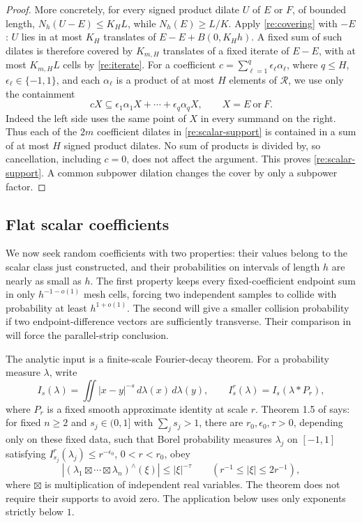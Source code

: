\begin{proof}
More concretely, for every signed product dilate \(U\) of \(E\) or
\(F\), of bounded length, \(N_h(U-E)\le K_HL\), while
\(N_h(E)\ge L/K\).  Apply \eqref{re:covering} with \(-E\): \(U\)
lies in at most \(K_H\) translates of \(E-E+B(0,K_Hh)\).
A fixed sum of such dilates is therefore covered by \(K_{m,H}\)
translates of a fixed iterate of \(E-E\), with at most
\(K_{m,H}L\) cells by \eqref{re:iterate}.  For a coefficient
\(c=\sum_{\ell=1}^q\epsilon_\ell\alpha_\ell\), where
\(q\le H\), \(\epsilon_\ell\in\{-1,1\}\), and each
\(\alpha_\ell\) is a product of at most \(H\) elements of
\(\mathcal R\), we use only the containment
\[
 cX\subseteq \epsilon_1\alpha_1X+\cdots+\epsilon_q\alpha_qX,
 \qquad X=E\ \text{or}\ F.
\]
Indeed the left side uses the same point of \(X\) in every summand
on the right.  Thus each of the \(2m\) coefficient dilates in
\eqref{re:scalar-support} is contained in a sum of at most \(H\)
signed product dilates.  No sum of products is divided by, so
cancellation, including \(c=0\), does not affect the argument.
This proves \eqref{re:scalar-support}.
A common subpower dilation changes the cover by only a subpower
factor.
\end{proof}

\subsection{Flat scalar coefficients}

We now seek random coefficients with two properties: their values
belong to the scalar class just constructed, and their probabilities
on intervals of length \(h\) are nearly as small as \(h\).  The
first property keeps every fixed-coefficient endpoint sum in only
\(h^{-1-o(1)}\) mesh cells, forcing two independent samples to
collide with probability at least \(h^{1+o(1)}\).  The second will
give a smaller collision probability if two endpoint-difference
vectors are sufficiently transverse.  Their comparison in
 will force the parallel-strip conclusion.

The analytic input is a finite-scale Fourier-decay theorem.  For a
probability measure \(\lambda\), write
\[
 I_s(\lambda)=\iint |x-y|^{-s}\,d\lambda(x)\,d\lambda(y),
 \qquad I_s^r(\lambda)=I_s(\lambda*P_r),
\]
where \(P_r\) is a fixed smooth approximate identity at scale
\(r\).  Theorem 1.5 of \citet{OrponenDeSaxceShmerkin} says: for
fixed \(n\ge2\) and \(s_j\in(0,1]\) with \(\sum_j s_j>1\), there are
\(r_0,\epsilon_0,\tau>0\), depending only on these fixed data, such
that Borel probability measures \(\lambda_j\) on \([-1,1]\) satisfying
\(I_{s_j}^r(\lambda_j)\le r^{-\epsilon_0}\), \(0<r<r_0\), obey
\begin{equation}\label{re:oss-input}
 |(\lambda_1\boxtimes\cdots\boxtimes\lambda_n)^\wedge(\xi)|
 \le |\xi|^{-\tau}\qquad(r^{-1}\le|\xi|\le2r^{-1}),
\end{equation}
where \(\boxtimes\) is multiplication of independent real variables.
The theorem does not require their supports to avoid zero.
The application below uses only exponents strictly below \(1\).

